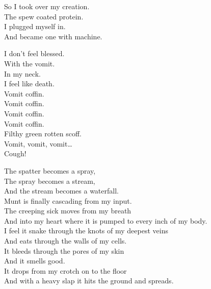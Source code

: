 So I took over my creation. \\
The spew coated protein. \\
I plugged myself in. \\
And became one with machine. \\


I don't feel blessed. \\
With the vomit. \\
In my neck. \\
I feel like death. \\

Vomit coffin. \\
Vomit coffin. \\
Vomit coffin. \\
Vomit coffin. \\

Filthy green rotten scoff. \\

Vomit, vomit, vomit… \\
Cough! \\





The spatter becomes a spray, \\
The spray becomes a stream, \\
And the stream becomes a waterfall. \\
Munt is finally cascading from my input. \\

The creeping sick moves from my breath \\
And into my heart where it is pumped to every inch of my body. \\
I feel it snake through the knots of my deepest veins \\
And eats through the walls of my cells. \\

It bleeds through the pores of my skin \\
And it smells good. \\
It drops from my crotch on to the floor \\
And with a heavy slap it hits the ground and spreads. \\

